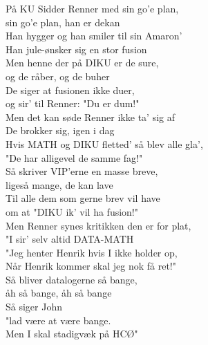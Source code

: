 På KU Sidder Renner med sin go'e plan,\\
sin go'e plan, han er dekan\\
Han hygger og han smiler til sin Amaron'\\
Han jule-ønsker sig en stor fusion\\

Men henne der på DIKU er de sure,\\
og de råber, og de buher\\
De siger at fusionen ikke duer,\\
og sir' til Renner: "Du er dum!"\\

Men det kan søde Renner ikke ta' sig af\\
De brokker sig, igen i dag\\
Hvis MATH og DIKU fletted' så blev alle gla',\\
"De har alligevel de samme fag!"\\

Så skriver VIP'erne en masse breve,\\
ligeså mange, de kan lave\\
Til alle dem som gerne brev vil have\\
om at "DIKU ik' vil ha fusion!"\\

Men Renner synes kritikken den er for plat,\\
"I sir' selv altid DATA-MATH\\
"Jeg henter Henrik hvis I ikke holder op,\\
Når Henrik kommer skal jeg nok få ret!"\\

Så bliver datalogerne så bange,\\
åh så bange, åh så bange\\
Så siger John\\
"lad være at være bange.\\
Men I skal stadigvæk på HCØ"\\

